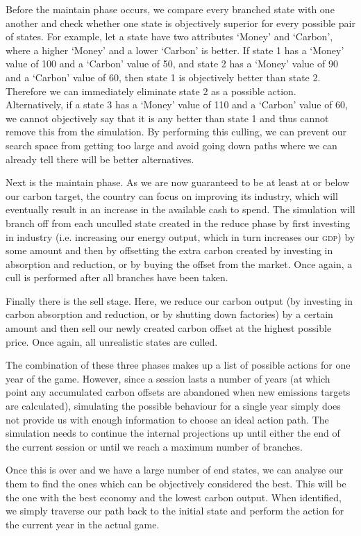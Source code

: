 Before the maintain phase occurs, we compare every branched state with one another and check whether one state is objectively superior for every possible pair of states. For example, let a state have two attributes `Money' and `Carbon', where a higher `Money' and a lower `Carbon' is better. If state 1 has a `Money' value of 100 and a `Carbon' value of 50, and state 2 has a `Money' value of 90 and a `Carbon' value of 60, then state 1 is objectively better than state 2. Therefore we can immediately eliminate state 2 as a possible action. Alternatively, if a state 3 has a `Money' value of 110 and a `Carbon' value of 60, we cannot objectively say that it is any better than state 1 and thus cannot remove this from the simulation. By performing this culling, we can prevent our search space from getting too large and avoid going down paths where we can already tell there will be better alternatives.

Next is the maintain phase. As we are now guaranteed to be at least at or below our carbon target, the country can focus on improving its industry, which will eventually result in an increase in the available cash to spend. The simulation will branch off from each unculled state created in the reduce phase by first investing in industry (i.e. increasing our energy output, which in turn increases our \textsc{gdp}) by some amount and then by offsetting the extra carbon created by investing in absorption and reduction, or by buying the offset from the market. Once again, a cull is performed after all branches have been taken.

Finally there is the sell stage. Here, we reduce our carbon output (by investing in carbon absorption and reduction, or by shutting down factories) by a certain amount and then sell our newly created carbon offset at the highest possible price. Once again, all unrealistic states are culled.

The combination of these three phases makes up a list of possible actions for one year of the game. However, since a session lasts a number of years (at which point any accumulated carbon offsets are abandoned when new emissions targets are calculated), simulating the possible behaviour for a single year simply does not provide us with enough information to choose an ideal action path. The simulation needs to continue the internal projections up until either the end of the current session or until we reach a maximum number of branches.

Once this is over and we have a large number of end states, we can analyse our them to find the ones which can be objectively considered the best. This will be the one with the best economy and the lowest carbon output. When identified, we simply traverse our path back to the initial state and perform the action for the current year in the actual game.

